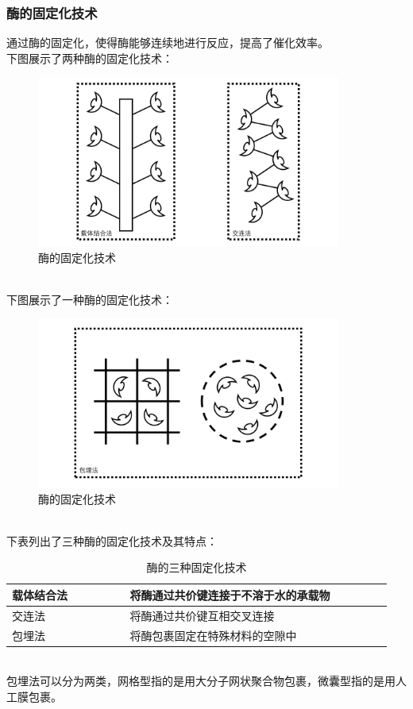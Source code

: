 \documentclass[UTF8]{ctexart}
\begin{document}
\subsubsection{酶的固定化技术}
    通过酶的固定化，使得酶能够连续地进行反应，提高了催化效率。\\[3mm]
    下图展示了两种酶的固定化技术：\vspace{-5pt}
    \begin{figure}[h]
        \begin{center}
            \includegraphics[width=10cm]{BiologyImage/66.jpg}
        \end{center}
        \caption{酶的固定化技术}
    \end{figure}\\
    下图展示了一种酶的固定化技术：\vspace{-5pt}
    \begin{figure}[h]
        \begin{center}
            \includegraphics[width=10cm]{BiologyImage/67.jpg}
        \end{center}
        \caption{酶的固定化技术}
    \end{figure}\\[1mm]
    下表列出了三种酶的固定化技术及其特点：\vspace{10pt}
    \begin{table}[h!]
        \begin{center}
            \begin{tabular}{l|l}
                \hline
                载体结合法~~~~~~~~&将酶通过共价键连接于不溶于水的承载物~~~~~~~~\\ \hline
                交连法~~~~~~~~&将酶通过共价键互相交叉连接~~~~~~~~\\ \hline
                包埋法~~~~~~~~&将酶包裹固定在特殊材料的空隙中~~~~~~~~\\ \hline
            \end{tabular}
            \caption{酶的三种固定化技术}
        \end{center}
    \end{table}\\
    包埋法可以分为两类，网格型指的是用大分子网状聚合物包裹，微囊型指的是用人工膜包裹。
\end{document}
